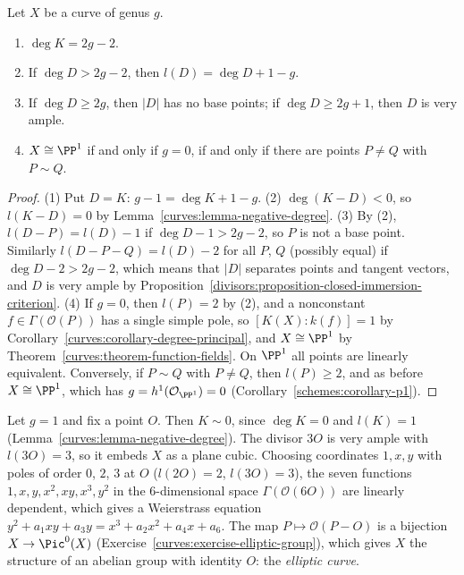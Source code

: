 \begin{corollary}\label{curves:corollary-riemann-roch-consequences}
Let $X$ be a curve of genus $g$.
\begin{enumerate}
\item $\deg K = 2g - 2$.
\item If $\deg D > 2g - 2$, then $l(D) = \deg D + 1 - g$.
\item If $\deg D \geq 2g$, then $|D|$ has no base points; if $\deg D \geq 2g + 1$, then $D$ is very ample.
\item $X \cong \PP^1$ if and only if $g = 0$, if and only if there are points $P \neq Q$ with $P \sim Q$.
\end{enumerate}
\end{corollary}

\begin{proof}
(1) Put $D = K$: $g - 1 = \deg K + 1 - g$. (2) $\deg(K - D) < 0$, so $l(K - D) = 0$ by Lemma~\ref{curves:lemma-negative-degree}. (3) By (2), $l(D - P) = l(D) - 1$ if
$\deg D - 1 > 2g - 2$, so $P$ is not a base point. Similarly $l(D - P - Q) = l(D) - 2$ for all $P$, $Q$ (possibly equal) if $\deg D - 2 > 2g - 2$, which means that $|D|$
separates points and tangent vectors, and $D$ is very ample by Proposition~\ref{divisors:proposition-closed-immersion-criterion}. (4) If $g = 0$, then $l(P) = 2$ by (2), and a
nonconstant $f \in \Gamma(\mathcal{O}(P))$ has a single simple pole, so $[K(X) : k(f)] = 1$ by Corollary~\ref{curves:corollary-degree-principal}, and $X \cong \PP^1$ by
Theorem~\ref{curves:theorem-function-fields}. On $\PP^1$ all points are linearly equivalent. Conversely, if $P \sim Q$ with $P \neq Q$, then $l(P) \geq 2$, and as before
$X \cong \PP^1$, which has $g = h^1(\mathcal{O}_{\PP^1}) = 0$ (Corollary~\ref{schemes:corollary-p1}).
\end{proof}

\begin{example}\label{curves:example-elliptic}
Let $g = 1$ and fix a point $O$. Then $K \sim 0$, since $\deg K = 0$ and $l(K) = 1$ (Lemma~\ref{curves:lemma-negative-degree}). The divisor $3O$ is very ample with
$l(3O) = 3$, so it embeds $X$ as a plane cubic. Choosing coordinates $1, x, y$ with poles of order $0$, $2$, $3$ at $O$ ($l(2O) = 2$, $l(3O) = 3$), the seven functions
$1, x, y, x^2, xy, x^3, y^2$ in the $6$-dimensional space $\Gamma(\mathcal{O}(6O))$ are linearly dependent, which gives a Weierstrass equation
$y^2 + a_1xy + a_3y = x^3 + a_2x^2 + a_4x + a_6$. The map $P \mapsto \mathcal{O}(P - O)$ is a bijection $X \to \Pic^0(X)$ (Exercise~\ref{curves:exercise-elliptic-group}), which gives
$X$ the structure of an abelian group with identity $O$: the \emph{elliptic curve}.
\end{example}

